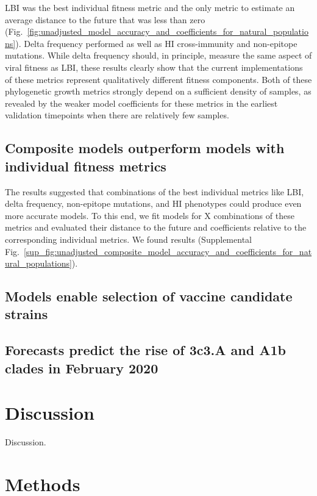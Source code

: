 LBI was the best individual fitness metric and the only metric to estimate an average distance to the future that was less than zero (Fig.~\ref{fig:unadjusted_model_accuracy_and_coefficients_for_natural_populations}).
Delta frequency performed as well as HI cross-immunity and non-epitope mutations.
While delta frequency should, in principle, measure the same aspect of viral fitness as LBI, these results clearly show that the current implementations of these metrics represent qualitatively different fitness components.
Both of these phylogenetic growth metrics strongly depend on a sufficient density of samples, as revealed by the weaker model coefficients for these metrics in the earliest validation timepoints when there are relatively few samples.

\subsection*{Composite models outperform models with individual fitness metrics}

The results suggested that combinations of the best individual metrics like LBI, delta frequency, non-epitope mutations, and HI phenotypes could produce even more accurate models.
To this end, we fit models for X combinations of these metrics and evaluated their distance to the future and coefficients relative to the corresponding individual metrics.
We found results (Supplemental Fig.~\ref{sup_fig:unadjusted_composite_model_accuracy_and_coefficients_for_natural_populations}).

\subsection*{Models enable selection of vaccine candidate strains}

\subsection*{Forecasts predict the rise of 3c3.A and A1b clades in February 2020}

\section*{Discussion}

Discussion.

\section*{Methods}

